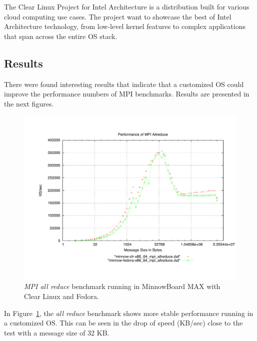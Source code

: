 The Clear Linux Project for Intel Architecture \cite{clear-linux} is a
distribution built for various cloud computing use cases. The project  want to showcase
the best of Intel Architecture technology, from low-level kernel features to
complex applications that span across the entire OS stack.

\subsection{Results}

There were found interesting results that indicate that a customized OS could 
improve the performance numbers of MPI benchmarks. Results are presented in the
next figures.

\begin{figure}
  \includegraphics[width=\paperwidth]{images/mpbench_clr_experiments/mpi_allreduce.pdf}
\caption{\textit{MPI all reduce} benchmark running in MinnowBoard MAX with Clear Linux and
Fedora.}
\label{mpi_allreduce_clr_fedora}
\end{figure}

In Figure~\ref{mpi_allreduce_clr_fedora}, the \textit{all reduce} benchmark
shows more stable performance running in a customized OS. This can be seen in
the drop of speed (KB/sec) close to the test with a message size of 32 KB. 

